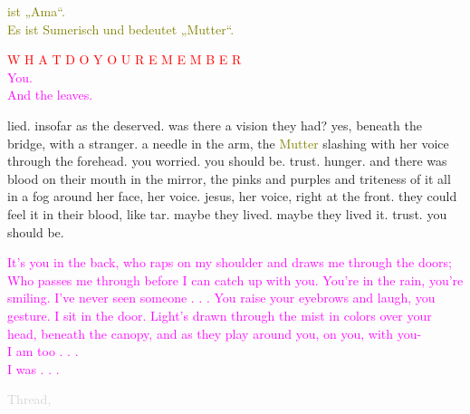 \documentclass[11pt]{article}
\begin{document}
\begingroup
\begin{center}
\textcolor{olive}{ist „Ama“. \\ Es ist Sumerisch und bedeutet „Mutter“.}
\end{center}
\endgroup

\begingroup
\begin{center}
\textcolor{red}{W H A T \hspace{10mm} D O \hspace{10mm} Y O U \hspace{10mm} R E M E M B E R} \\ \textcolor{magenta}{You. \\ And the leaves. }
\end{center}
\endgroup

\begingroup
lied. insofar as the deserved. was there a vision they had? yes, beneath the bridge, with a stranger. a needle in the arm, the \textcolor{olive}{Mutter} slashing with her voice through the forehead. you worried. you should be. trust. hunger. and there was blood on their mouth in the mirror, the pinks and purples and triteness of it all in a fog around her face, her voice. jesus, her voice, right at the front. they could feel it in their blood, like tar. maybe they lived. maybe they lived it. trust. you should be.
\endgroup

\begingroup
\begin{center}
\textcolor{magenta}{It's you in the back, who raps on my shoulder and draws me through the doors; Who passes me through before I can catch up with you. You're in the rain, you're smiling. I've never seen someone . . . You raise your eyebrows and laugh, you gesture. I sit in the door. Light's drawn through the mist in colors over your head, beneath the canopy, and as they play around you, on you, with you- \\ I am too . . . \\ I was . . .}
\end{center}
\endgroup

\begingroup
\begin{center}
\textcolor{lightgray}{Thread, }
\rightskip\leftskip
\end{center}
\endgroup
\end{document}
